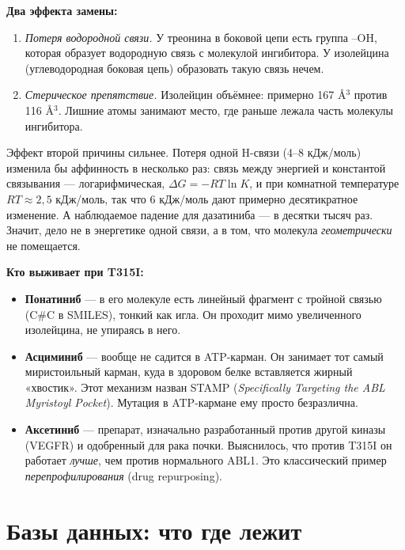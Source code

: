 \documentclass[11pt,a4paper]{article}
\newcommand{\code}[1]{{\ttfamily #1}}
\begin{document}
\textbf{Два эффекта замены:}
\begin{enumerate}[leftmargin=*,topsep=2pt,itemsep=2pt]
\item \emph{Потеря водородной связи.} У треонина в боковой цепи есть группа --OH,
которая образует водородную связь с молекулой ингибитора. У изолейцина
(углеводородная боковая цепь) образовать такую связь нечем.
\item \emph{Стерическое препятствие.} Изолейцин объёмнее: примерно 167 \AA$^3$
против 116 \AA$^3$. Лишние атомы занимают место, где раньше лежала часть молекулы
ингибитора.
\end{enumerate}

Эффект второй причины сильнее. Потеря одной H-связи (4--8 кДж/моль) изменила бы
аффинность в несколько раз: связь между энергией и константой связывания ---
логарифмическая, $\Delta G = -RT\ln K$, и при комнатной температуре
$RT \approx 2{,}5$ кДж/моль, так что 6 кДж/моль дают примерно десятикратное
изменение. А наблюдаемое падение для дазатиниба --- в десятки тысяч раз. Значит,
дело не в энергетике одной связи, а в том, что молекула \emph{геометрически} не
помещается.

\textbf{Кто выживает при T315I:}
\begin{itemize}[leftmargin=*,topsep=2pt,itemsep=2pt]
\item \textbf{Понатиниб} --- в его молекуле есть линейный фрагмент с тройной
связью (\code{C\#C} в SMILES), тонкий как игла. Он проходит мимо увеличенного
изолейцина, не упираясь в него.
\item \textbf{Асциминиб} --- вообще не садится в ATP-карман. Он занимает тот
самый миристоильный карман, куда в здоровом белке вставляется жирный «хвостик».
Этот механизм назван STAMP (\emph{Specifically Targeting the ABL Myristoyl Pocket}).
Мутация в ATP-кармане ему просто безразлична.
\item \textbf{Аксетиниб} --- препарат, изначально разработанный против другой
киназы (VEGFR) и одобренный для рака почки. Выяснилось, что против T315I он
работает \emph{лучше}, чем против нормального ABL1. Это классический пример
\emph{перепрофилирования} (drug repurposing).
\end{itemize}

\section{Базы данных: что где лежит}
\end{document}
